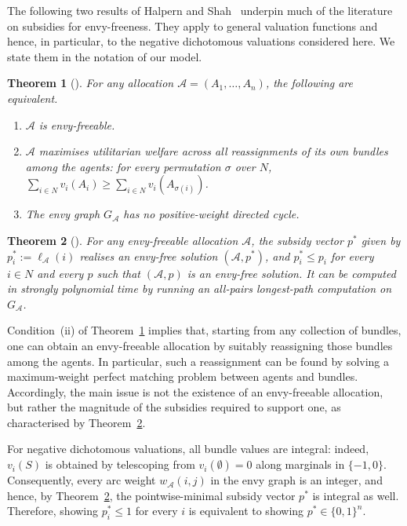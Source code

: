 \documentclass[11pt]{article}
\theoremstyle{plain}
\newtheorem{theorem}{Theorem}
\theoremstyle{plain}
\newcommand{\agents}{N}                       %
\newcommand{\alloc}{\mathcal{A}}              %
\newcommand{\bundle}[1]{A_{#1}}
\newcommand{\subsidy}{p}                      %
\newcommand{\optsubsidy}{p^{*}}               %
\newcommand{\envygraph}[1]{G_{#1}}            %
\newcommand{\edgew}[1]{w_{#1}}                %
\newcommand{\pathw}[1]{\ell_{#1}}             %
\begin{document}
The following two results of Halpern and Shah~\cite{HS19} underpin much of the literature on subsidies for envy-freeness. They apply to general valuation functions and hence, in particular, to the negative dichotomous valuations considered here. We state them in the notation of our model.
\begin{theorem}[\cite{HS19}] \label{thm:hs-characterisation}
For any allocation $\alloc = (\bundle{1},\dots,\bundle{n})$, the following are equivalent. \begin{enumerate}   \item[(i)] $\alloc$ is envy-freeable.   \item[(ii)] $\alloc$ maximises utilitarian welfare across all reassignments of its own bundles among the agents: for every permutation $\sigma$ over   $\agents$, $\sum_{i \in \agents} v_i(\bundle{i}) \ge    \sum_{i \in \agents} v_i(A_{\sigma(i)})$.   \item[(iii)] The envy graph $\envygraph{\alloc}$ has no positive-weight directed cycle.
\end{enumerate}
\end{theorem}

\begin{theorem}[\cite{HS19}]
\label{thm:hs-minsubsidy}
For any envy-freeable allocation $\alloc$, the subsidy vector $\optsubsidy$ given by $\optsubsidy_i := \pathw{\alloc}(i)$ realises an envy-free solution $(\alloc, \optsubsidy)$, and $\optsubsidy_i \le \subsidy_i$ for every $i \in \agents$ and every $\subsidy$ such that $(\alloc,\subsidy)$ is an envy-free solution. It can be computed in strongly polynomial time by running an all-pairs longest-path computation on $\envygraph{\alloc}$.
\end{theorem}

Condition~(ii) of Theorem~\ref{thm:hs-characterisation} implies that, starting from any collection of bundles, one can obtain an envy-freeable allocation by suitably reassigning those bundles among the agents. In particular, such a reassignment can be found by solving a maximum-weight perfect matching problem between agents and bundles. Accordingly, the main issue is not the existence of an envy-freeable allocation, but rather the magnitude of the subsidies required to support one, as characterised by Theorem~\ref{thm:hs-minsubsidy}. 


For negative dichotomous valuations, all bundle values are integral: indeed, $v_i(S)$ is obtained by telescoping from $v_i(\emptyset)=0$ along marginals in $\{-1,0\}$. Consequently, every arc weight $\edgew{\alloc}(i,j)$ in the envy graph is an integer, and hence, by Theorem~\ref{thm:hs-minsubsidy}, the pointwise-minimal subsidy vector $\optsubsidy$ is integral as well. Therefore, showing $\optsubsidy_i\leq 1$ for every $i$ is equivalent to showing $\optsubsidy\in\{0,1\}^n$.
\end{document}
